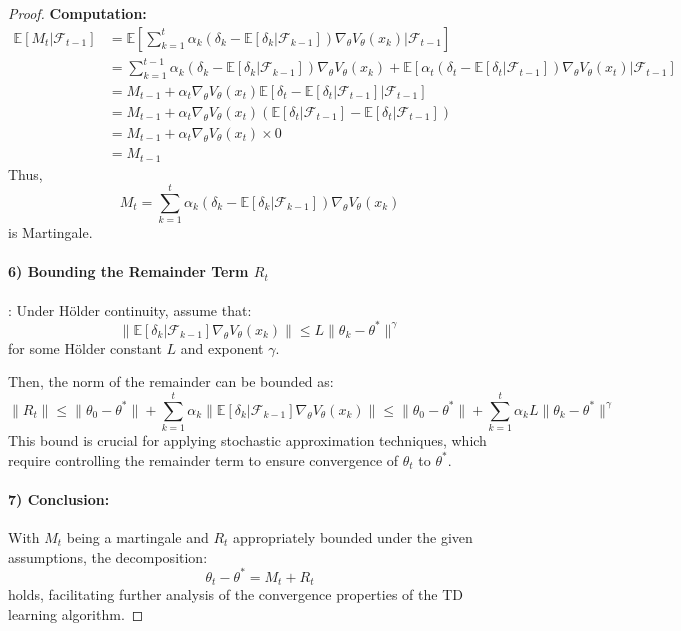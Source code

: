 \begin{proof}
\textbf{Computation:}
\begin{align*}
\mathbb{E}[M_t | \mathcal{F}_{t-1}] &= \mathbb{E}\left[ \sum_{k=1}^t \alpha_k (\delta_k - \mathbb{E}[\delta_k|\mathcal{F}_{k-1}])\nabla_\theta V_\theta(x_k) \Big| \mathcal{F}_{t-1} \right] \\
&= \sum_{k=1}^{t-1} \alpha_k (\delta_k - \mathbb{E}[\delta_k|\mathcal{F}_{k-1}])\nabla_\theta V_\theta(x_k) + \mathbb{E}\left[ \alpha_t (\delta_t - \mathbb{E}[\delta_t|\mathcal{F}_{t-1}])\nabla_\theta V_\theta(x_t) \Big| \mathcal{F}_{t-1} \right] \\
&= M_{t-1} + \alpha_t \nabla_\theta V_\theta(x_t) \mathbb{E}\left[ \delta_t - \mathbb{E}[\delta_t|\mathcal{F}_{t-1}] \Big| \mathcal{F}_{t-1} \right] \\
&= M_{t-1} + \alpha_t \nabla_\theta V_\theta(x_t) \left( \mathbb{E}[\delta_t | \mathcal{F}_{t-1}] - \mathbb{E}[\delta_t | \mathcal{F}_{t-1}] \right) \\
&= M_{t-1} + \alpha_t \nabla_\theta V_\theta(x_t) \times 0 \\
&= M_{t-1}
\end{align*}
Thus,
\begin{equation}\label{eq:martingale}
    M_t = \sum_{k=1}^t \alpha_k \left( \delta_k - \mathbb{E}[\delta_k | \mathcal{F}_{k-1}] \right) \nabla_\theta V_\theta(x_k)
\end{equation}
is Martingale.

\paragraph{6) Bounding the Remainder Term \( R_t \)}:
Under Hölder continuity, assume that:
\[
\|\mathbb{E}[\delta_k|\mathcal{F}_{k-1}]\nabla_\theta V_\theta(x_k)\| \leq L \|\theta_k - \theta^*\|^\gamma
\]
for some Hölder constant \( L \) and exponent \( \gamma \).

Then, the norm of the remainder can be bounded as:
\begin{equation}\label{eq:R_t}
\|R_t\| \leq \|\theta_0 - \theta^*\| + \sum_{k=1}^t \alpha_k \|\mathbb{E}[\delta_k|\mathcal{F}_{k-1}]\nabla_\theta V_\theta(x_k)\| \leq \|\theta_0 - \theta^*\| + \sum_{k=1}^t \alpha_k L \|\theta_k - \theta^*\|^\gamma
\end{equation}
This bound is crucial for applying stochastic approximation techniques, which require controlling the remainder term to ensure convergence of \( \theta_t \) to \( \theta^* \).

\paragraph{7) Conclusion:}
With \( M_t \) being a martingale and \( R_t \) appropriately bounded under the given assumptions, the decomposition:
\[
\theta_t - \theta^* = M_t + R_t
\]
holds, facilitating further analysis of the convergence properties of the TD learning algorithm.

\end{proof}